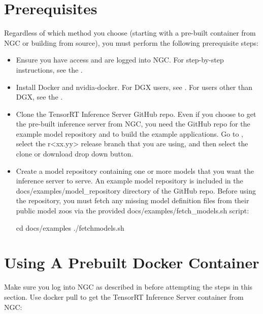 \documentclass[letterpaper,10pt,english]{sphinxmanual}
\begin{document}
\section{Prerequisites}
\label{\detokenize{quickstart:prerequisites}}\label{\detokenize{quickstart:section-prerequisites}}
Regardless of which method you choose (starting with a pre-built
container from NGC or building from source), you must perform the
following prerequisite steps:
\begin{itemize}
\item {} 
Ensure you have access and are logged into NGC.  For step-by-step
instructions, see the .

\item {} 
Install Docker and nvidia-docker.  For DGX users, see .
For users other than DGX, see the .

\item {} 
Clone the TensorRT Inference Server GitHub repo. Even if you choose
to get the pre-built inference server from NGC, you need the GitHub
repo for the example model repository and to build the example
applications. Go to
, select the
r\textless{}xx.yy\textgreater{} release branch that you are using, and then select the
clone or download drop down button.

\item {} 
Create a model repository containing one or more models that you
want the inference server to serve. An example model repository is
included in the docs/examples/model\_repository directory of the
GitHub repo. Before using the repository, you must fetch any missing
model definition files from their public model zoos via the provided
docs/examples/fetch\_models.sh script:

\begin{sphinxVerbatim}[commandchars=\\\{\}]
\PYGZdl{} cd docs/examples
\PYGZdl{} ./fetch\PYGZus{}models.sh
\end{sphinxVerbatim}

\end{itemize}


\section{Using A Prebuilt Docker Container}
\label{\detokenize{quickstart:using-a-prebuilt-docker-container}}\label{\detokenize{quickstart:section-using-a-prebuilt-docker-container}}
Make sure you log into NGC as described in
{\hyperref[\detokenize{quickstart:section-prerequisites}]{}} before attempting the steps in this
section.  Use docker pull to get the TensorRT Inference Server
container from NGC:
\end{document}
